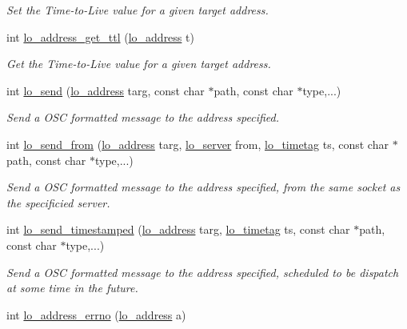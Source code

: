 \begin{DoxyCompactItemize}
\begin{DoxyCompactList}\small\item\em \-Set the \-Time-\/to-\/\-Live value for a given target address. \end{DoxyCompactList}\item 
int \hyperlink{group__liblo_ga3652ba694ba3c153dc96917e7321131c}{lo\-\_\-address\-\_\-get\-\_\-ttl} (\hyperlink{lo__types_8h_abf9b53223467de596b89e1377b0f3f3d}{lo\-\_\-address} t)
\begin{DoxyCompactList}\small\item\em \-Get the \-Time-\/to-\/\-Live value for a given target address. \end{DoxyCompactList}\item 
int \hyperlink{group__liblo_gafa4253874f97c2c16254ac57d2b7c987}{lo\-\_\-send} (\hyperlink{lo__types_8h_abf9b53223467de596b89e1377b0f3f3d}{lo\-\_\-address} targ, const char $\ast$path, const char $\ast$type,...)
\begin{DoxyCompactList}\small\item\em \-Send a \-O\-S\-C formatted message to the address specified. \end{DoxyCompactList}\item 
int \hyperlink{group__liblo_gaa4a314562b09e2fd00749a5d0b4d0955}{lo\-\_\-send\-\_\-from} (\hyperlink{lo__types_8h_abf9b53223467de596b89e1377b0f3f3d}{lo\-\_\-address} targ, \hyperlink{lo__types_8h_a59067bf50cf8abb4371da6f03c9036c9}{lo\-\_\-server} from, \hyperlink{structlo__timetag}{lo\-\_\-timetag} ts, const char $\ast$path, const char $\ast$type,...)
\begin{DoxyCompactList}\small\item\em \-Send a \-O\-S\-C formatted message to the address specified, from the same socket as the specificied server. \end{DoxyCompactList}\item 
int \hyperlink{group__liblo_ga42ec6437789c7516c5b7909d8504751a}{lo\-\_\-send\-\_\-timestamped} (\hyperlink{lo__types_8h_abf9b53223467de596b89e1377b0f3f3d}{lo\-\_\-address} targ, \hyperlink{structlo__timetag}{lo\-\_\-timetag} ts, const char $\ast$path, const char $\ast$type,...)
\begin{DoxyCompactList}\small\item\em \-Send a \-O\-S\-C formatted message to the address specified, scheduled to be dispatch at some time in the future. \end{DoxyCompactList}\item 
int \hyperlink{group__liblo_ga407e1694a2ec58ee5b90c6390e0a5d53}{lo\-\_\-address\-\_\-errno} (\hyperlink{lo__types_8h_abf9b53223467de596b89e1377b0f3f3d}{lo\-\_\-address} a)

\end{DoxyCompactItemize}
